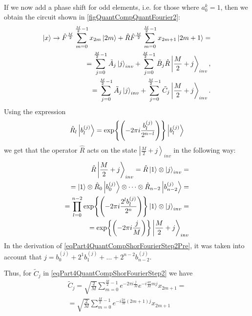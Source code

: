 

If we now add a phase shift for odd elements, i.e. for
those where $a_0^k = 1$, then we obtain the circuit shown in
\autoref{figQuantCompQuantFourier2}: 
\begin{eqnarray}
\ket{x} \rightarrow
\hat{F}^{\frac{M}{2}} \sum_{m = 0}^{\frac{M}{2} - 1}x_{2m} \ket{2m} +
\hat{R}\hat{F}^{\frac{M}{2}} \sum_{m = 0}^{\frac{M}{2} - 1} x_{2m + 1}
\ket{2m+1} =
\nonumber \\
= 
\sum^{\frac{M}{2} - 1}_{j = 0} \tilde{A}_{j} \ket{j}_{inv} +
\sum^{\frac{M}{2} - 1}_{j = 0}  
\tilde{B}_{j} \hat{R}\left|\frac{M}{2} + j\right>_{inv},
\nonumber \\
= 
\sum^{\frac{M}{2} - 1}_{j = 0}  \tilde{A}_{j} \ket{j}_{inv} +
\sum^{\frac{M}{2} - 1}_{j = 0}  
\tilde{C}_{j} \left|\frac{M}{2} + j\right>_{inv}.
\label{eqPart4QuantCompShorFourierStep2}
\end{eqnarray}
Using the expression
\begin{equation}
\hat{R}_l \ket{b^{(j)}_l} = 
\exp{\left(- 2 \pi i \frac{b^{(j)}_l}{2^{n-l}}\right)}
\ket{b^{(j)}_l}
\nonumber
\end{equation}
we get that the operator $\hat{R}$ acts on the state 
$\left|\frac{M}{2} + j\right>_{inv}$ in the following way:
\begin{eqnarray}
\hat{R}\left|\frac{M}{2} + j\right>_{inv} = 
\hat{R}\ket{1} \otimes  \ket{j}_{inv} = 
\nonumber \\
= 
\ket{1} \otimes \hat{R}_0 \ket{b^{(j)}_0}
\otimes \cdots \otimes \hat{R}_{n-2} \ket{b^{(j)}_{n-2}} = 
\nonumber \\
= 
\prod_{l = 0}^{n-2}\exp{\left(- 2 \pi i \frac{2^lb^{(j)}_l}{2^n}\right)}
\ket{1} \otimes \ket{j}_{inv} = 
\nonumber \\
=
\exp{\left(-2 \pi i \frac{j}{M}\right)}
\left|\frac{M}{2} + j\right>_{inv} 
\label{eqPart4QuantCompShorFourierStep2Pre}
\end{eqnarray}
In the derivation of \eqref{eqPart4QuantCompShorFourierStep2Pre}, it was taken into account that $j = b^{(j)}_0 + 2^1 b^{(j)}_1 + \dots + 2^{n-2} b^{(j)}_{n-2}$. 

Thus, for $\tilde{C}_{j}$ in 
\eqref{eqPart4QuantCompShorFourierStep2} we have
\begin{eqnarray}
\tilde{C}_{j} = 
\sqrt{\frac{2}{M}} 
\sum_{m = 0}^{\frac{M}{2} - 1} 
e^{- 2 \pi i \frac{j}{M}}
e^{-i \frac{4 \pi}{M} m j} x_{2m+1} =
\nonumber \\
=
\sqrt{\frac{2}{M}} 
\sum_{m = 0}^{\frac{M}{2} - 1} 
e^{-i \frac{2 \pi}{M} \left(2m+1\right) j} x_{2m+1}
\label{eqPart4QuantCompShorC}
\end{eqnarray}

